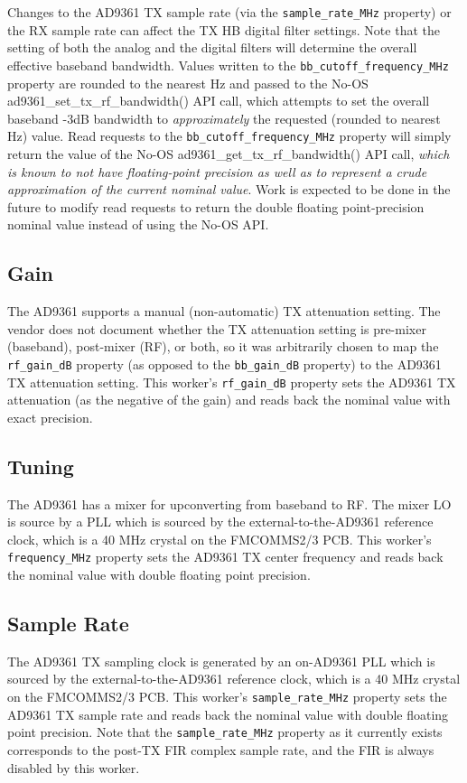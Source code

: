 \documentclass{article}
\begin{document}
Changes to the AD9361 TX sample rate (via the \verb+sample_rate_MHz+ property) or the RX sample rate can affect the TX HB digital filter settings. Note that the setting of both the analog and the digital filters will determine the overall effective baseband bandwidth. Values written to the \verb+bb_cutoff_frequency_MHz+ property are rounded to the nearest Hz and passed to the No-OS ad9361\_set\_tx\_rf\_bandwidth() API call, which attempts to set the overall baseband -3dB bandwidth to \textit{approximately} the requested (rounded to nearest Hz) value. Read requests to the \verb+bb_cutoff_frequency_MHz+ property will simply return the value of the No-OS ad9361\_get\_tx\_rf\_bandwidth() API call, \textit{which is known to not have floating-point precision as well as to represent a crude approximation of the current nominal value}. Work is expected to be done in the future to modify read requests to return the double floating point-precision nominal value instead of using the No-OS API.
\subsection*{Gain}
The AD9361 supports a manual (non-automatic) TX attenuation setting. The vendor does not document whether the TX attenuation setting is pre-mixer (baseband), post-mixer (RF), or both, so it was arbitrarily chosen to map the \verb+rf_gain_dB+ property (as opposed to the \verb+bb_gain_dB+ property) to the AD9361 TX attenuation setting. This worker's \verb+rf_gain_dB+ property sets the AD9361 TX attenuation (as the negative of the gain) and reads back the nominal value with exact precision.
\subsection*{Tuning}
The AD9361 has a mixer for upconverting from baseband to RF. The mixer LO is source by a PLL which is sourced by the external-to-the-AD9361 reference clock, which is a 40 MHz crystal on the FMCOMMS2/3 PCB. This worker's \verb+frequency_MHz+ property sets the AD9361 TX center frequency and reads back the nominal value with double floating point precision.

\subsection*{Sample Rate}
The AD9361 TX sampling clock is generated by an on-AD9361 PLL which is sourced by the external-to-the-AD9361 reference clock, which is a 40 MHz crystal on the FMCOMMS2/3 PCB. This worker's \verb+sample_rate_MHz+ property sets the AD9361 TX sample rate and reads back the nominal value with double floating point precision. Note that the \verb+sample_rate_MHz+ property as it currently exists corresponds to the post-TX FIR complex sample rate, and the FIR is always disabled by this worker.
\end{document}
